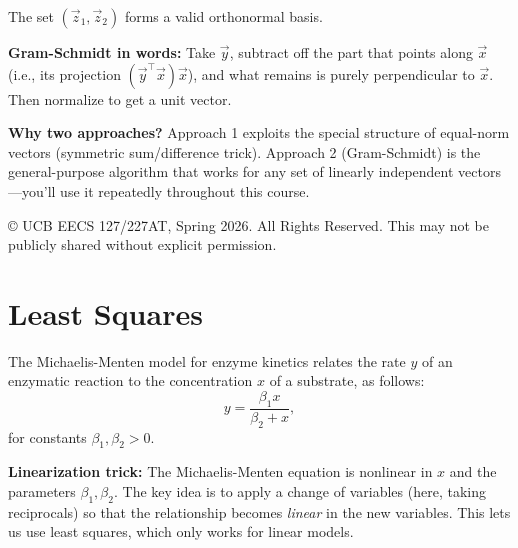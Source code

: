 \documentclass[10pt]{article}
\theoremstyle{definition}
\theoremstyle{plain}
\begin{document}
\begin{enumerate}[label=(\alph*)]
    The set $(\vec{z}_1, \vec{z}_2)$ forms a valid orthonormal basis.

    \begin{intuition}
    \textbf{Gram-Schmidt in words:} Take $\vec{y}$, subtract off the part that points along $\vec{x}$ (i.e., its projection $(\vec{y}^\top \vec{x})\vec{x}$), and what remains is purely perpendicular to $\vec{x}$. Then normalize to get a unit vector.

    \textbf{Why two approaches?} Approach 1 exploits the special structure of equal-norm vectors (symmetric sum/difference trick). Approach 2 (Gram-Schmidt) is the general-purpose algorithm that works for any set of linearly independent vectors---you'll use it repeatedly throughout this course.
    \end{intuition}
\end{enumerate}

\vfill
\noindent\footnotesize{\copyright{} UCB EECS 127/227AT, Spring 2026. \scriptsize{All Rights Reserved. This may not be publicly shared without explicit permission.}}

\newpage

\section{Least Squares}

The Michaelis-Menten model for enzyme kinetics relates the rate $y$ of an enzymatic reaction to the concentration $x$ of a substrate, as follows:
\begin{equation}
    y = \frac{\beta_1 x}{\beta_2 + x},
\end{equation}
for constants $\beta_1, \beta_2 > 0$.

\begin{keyconcept}
\textbf{Linearization trick:} The Michaelis-Menten equation is nonlinear in $x$ and the parameters $\beta_1, \beta_2$. The key idea is to apply a change of variables (here, taking reciprocals) so that the relationship becomes \emph{linear} in the new variables. This lets us use least squares, which only works for linear models.
\end{keyconcept}
\end{document}
